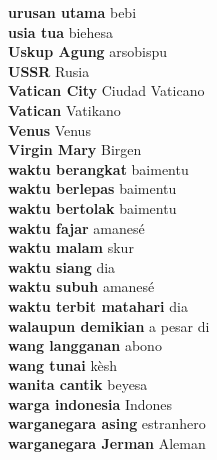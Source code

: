 \textbf{ urusan utama  } bebi \\
\textbf{ usia tua  } biehesa \\
\textbf{ Uskup Agung  } arsobispu \\
\textbf{ USSR  } Rusia \\
\textbf{ Vatican City  } Ciudad Vaticano \\
\textbf{ Vatican  } Vatikano \\
\textbf{ Venus  } Venus \\
\textbf{ Virgin Mary  } Birgen \\
\textbf{ waktu berangkat  } baimentu \\
\textbf{ waktu berlepas  } baimentu \\
\textbf{ waktu bertolak  } baimentu \\
\textbf{ waktu fajar  } amanesé \\
\textbf{ waktu malam  } skur \\
\textbf{ waktu siang  } dia \\
\textbf{ waktu subuh  } amanesé \\
\textbf{ waktu terbit matahari  } dia \\
\textbf{ walaupun demikian  } a pesar di \\
\textbf{ wang langganan  } abono \\
\textbf{ wang tunai  } kèsh \\
\textbf{ wanita cantik  } beyesa \\
\textbf{ warga indonesia  } Indones \\
\textbf{ warganegara asing  } estranhero \\
\textbf{ warganegara Jerman  } Aleman \\
